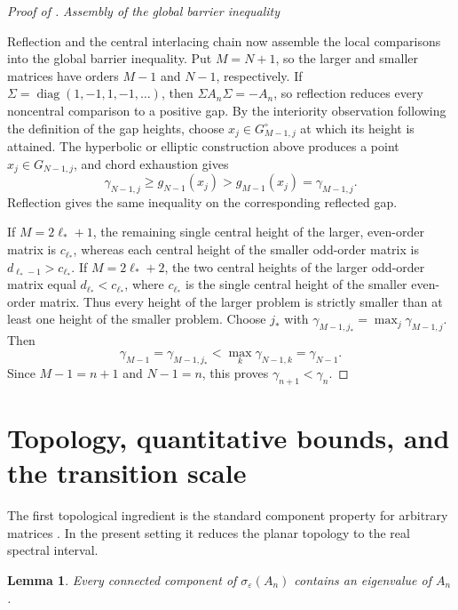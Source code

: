 \documentclass[12pt,anonymous]{iopjournal}
\numberwithin{equation}{section}
\newtheorem{lemma}[lemma]{Lemma}
\theoremstyle{remark}
\DeclareMathOperator{\diag}{diag}
\newcommand{\proofstage}[1]{%
  \par\medskip\noindent\textit{#1}\par\nobreak\smallskip}
\begin{document}
\begin{proof}[Proof of ]
\proofstage{Assembly of the global barrier inequality}
Reflection and the central interlacing chain now assemble the local
comparisons into the global barrier inequality.  Put \(M=N+1\), so the
larger and smaller matrices have orders \(M-1\) and \(N-1\), respectively.  If
\(\Sigma=\diag(1,-1,1,-1,\ldots)\), then
\(\Sigma A_n\Sigma=-A_n\), so reflection reduces every noncentral
comparison to a positive gap.  By the interiority observation following the
definition of the gap heights, choose
\(x_j\in G_{M-1,j}^{\circ}\) at which its height is attained.  The hyperbolic
or elliptic construction above produces a point
\(\widehat x_j\in G_{N-1,j}\), and chord exhaustion gives
\[
 \gamma_{N-1,j}\geq g_{N-1}(\widehat x_j)
 >g_{M-1}(x_j)=\gamma_{M-1,j}.
\]
Reflection gives the same inequality on the corresponding reflected gap.

If \(M=2\ell_*+1\), the remaining single central height of the larger,
even-order matrix is \(c_{\ell_*}\), whereas each central height of the
smaller odd-order matrix is \(d_{\ell_*-1}>c_{\ell_*}\).  If
\(M=2\ell_*+2\), the two central heights of the larger odd-order matrix
equal \(d_{\ell_*}<c_{\ell_*}\), where \(c_{\ell_*}\) is the single
central height of the smaller even-order matrix.
Thus every height of the larger problem is strictly smaller than at
least one height of the smaller problem.  Choose \(j_*\) with
\(\gamma_{M-1,j_*}=\max_j\gamma_{M-1,j}\).  Then
\[
 \gamma_{M-1}=\gamma_{M-1,j_*}
 <\max_k\gamma_{N-1,k}=\gamma_{N-1}.
\]
Since \(M-1=n+1\) and \(N-1=n\), this proves
\(\gamma_{n+1}<\gamma_n\).
\end{proof}

\section{Topology, quantitative bounds, and the transition scale}
\label{sec:topology-bounds}

The first topological ingredient is the standard component property for
arbitrary matrices
\cite{BurkeLewisOverton2003}.  In the present setting it reduces the planar
topology to the real spectral interval.

\begin{lemma}\label{lem:component}
Every connected component of \(\sigma_\varepsilon(A_n)\) contains an
eigenvalue of \(A_n\).
\end{lemma}
\end{document}
